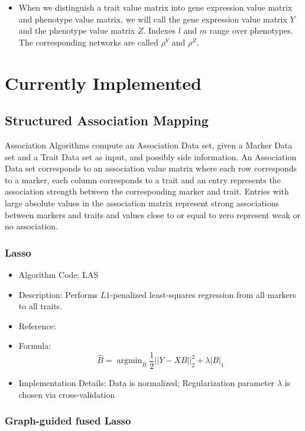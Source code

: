 \documentclass{article}
\newcommand{\argmin}{\operatorname{argmin}}
\begin{document}
\begin{itemize}
\item When we distinguish a trait value matrix into gene expression value matrix and phenotype value matrix, we will call the gene expression value matrix $Y$ and the phenotype value matrix $Z$. Indexes $l$ and $m$ range over phenotypes. The corresponding networks are called $\rho^Y$ and $\rho^Z$.
\end{itemize}

\section{Currently Implemented}


\subsection{Structured Association Mapping}

Association Algorithms compute an Association Data set, given a Marker Data set and a Trait Data set as input, and possibly side information. An Association Data set corresponds to an association value matrix where each row corresponds to a marker, each column corresponds to a trait and an entry represents the association strength between the corresponding marker and trait. Entries with large absolute values in the association matrix represent strong associations between markers and traits and values close to or equal to zero represent weak or no association.

\subsubsection{Lasso}

\begin{itemize}
\item Algorithm Code: LAS
\item Description: Performs $L1$-penalized least-squares regression from all markers to all traits.
\item Reference: \cite{Lasso}
\item Formula:
\begin{equation*}
\hat{B} = \argmin_{B} \frac{1}{2}||Y - XB||_2^2 + \lambda|B|_1
\end{equation*}
\item Implementation Details: Data is normalized; Regularization parameter $\lambda$ is chosen via cross-validation
\end{itemize}


\subsubsection{Graph-guided fused Lasso}
\end{document}
